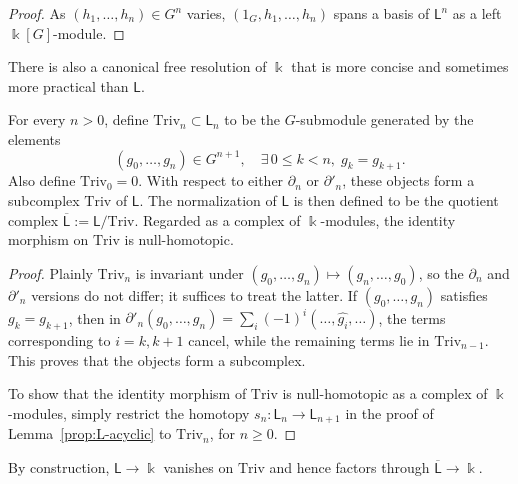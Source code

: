 \begin{proof}
	As $(h_1,\ldots,h_n)\in G^n$ varies,
	$(1_G,h_1,\ldots,h_n)$ spans a basis of $\mathsf{L}^n$ as a left
	$\Bbbk[G]$-module.
\end{proof}

There is also a canonical free resolution of $\Bbbk$ that is more concise and
sometimes more practical than $\mathsf{L}$.

\begin{definition-proposition}
	For every $n>0$, define $\mathrm{Triv}_n\subset\mathsf{L}_n$ to be the
	$G$-submodule generated by the elements
	\[ (g_0, \ldots, g_n) \in G^{n+1}, \quad \exists\, 0 \leq k < n, \; g_k = g_{k+1}. \]
	Also define $\mathrm{Triv}_0=0$. With respect to either $\partial_n$ or
	$\partial'_n$, these objects form a subcomplex $\mathrm{Triv}$ of
	$\mathsf{L}$. The normalization of $\mathsf{L}$ is then defined to be the
	quotient complex
	$\overline{\mathsf{L}}:=\mathsf{L}/\mathrm{Triv}$. Regarded as a complex of
	$\Bbbk$-modules, the identity morphism on $\mathrm{Triv}$ is
	null-homotopic.
\end{definition-proposition}

\begin{proof}
	Plainly $\mathrm{Triv}_n$ is invariant under
	$(g_0,\ldots,g_n)\mapsto(g_n,\ldots,g_0)$, so the $\partial_n$ and
	$\partial'_n$ versions do not differ; it suffices to treat the latter. If
	$(g_0,\ldots,g_n)$ satisfies $g_k=g_{k+1}$, then in
	$\partial'_n(g_0,\ldots,g_n)=
	\sum_i(-1)^i(\ldots,\widehat{g_i},\ldots)$, the terms corresponding to
	$i=k,k+1$ cancel, while the remaining terms lie in
	$\mathrm{Triv}_{n-1}$. This proves that the objects form a subcomplex.

	To show that the identity morphism of $\mathrm{Triv}$ is null-homotopic as
	a complex of $\Bbbk$-modules, simply restrict the homotopy
	$s_n:\mathsf{L}_n\to\mathsf{L}_{n+1}$ in the proof of
	Lemma~\ref{prop:L-acyclic} to $\mathrm{Triv}_n$, for $n\geq0$.
\end{proof}

By construction, $\mathsf{L}\to\Bbbk$ vanishes on $\mathrm{Triv}$ and hence
factors through $\overline{\mathsf{L}}\to\Bbbk$.

